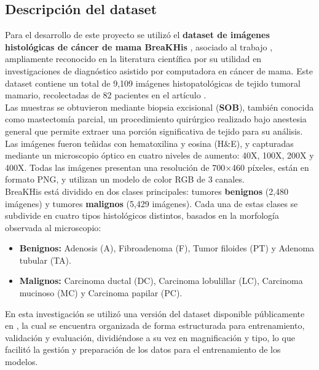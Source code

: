 \documentclass[12pt]{article} %
\begin{document}
\subsection{Descripción del dataset}
Para el desarrollo de este proyecto se utilizó el \textbf{dataset de imágenes histológicas de cáncer de mama BreaKHis} \cite{google_drive_folder}, asociado al trabajo \cite{bardou2018classification}, ampliamente reconocido en la literatura científica por su utilidad en investigaciones de diagnóstico asistido por computadora en cáncer de mama. Este dataset contiene un total de 9,109 imágenes histopatológicas de tejido tumoral mamario, recolectadas de 82 pacientes en el artículo \cite{spanhol2015dataset}.\\

Las muestras se obtuvieron mediante biopsia excisional (\textbf{SOB}), también conocida como mastectomía parcial, un procedimiento quirúrgico realizado bajo anestesia general que permite extraer una porción significativa de tejido para su análisis. Las imágenes fueron teñidas con hematoxilina y eosina (H\&E), y capturadas mediante un microscopio óptico en cuatro niveles de aumento: 40X, 100X, 200X y 400X. Todas las imágenes presentan una resolución de 700×460 píxeles, están en formato PNG, y utilizan un modelo de color RGB de 3 canales. \\

BreaKHis está dividido en dos clases principales: tumores \textbf{benignos} (2,480 imágenes) y tumores \textbf{malignos} (5,429 imágenes). Cada una de estas clases se subdivide en cuatro tipos histológicos distintos, basados en la morfología observada al microscopio: \\

\begin{itemize}
    \item \textbf{Benignos:} Adenosis (A), Fibroadenoma (F), Tumor filoides (PT) y Adenoma tubular (TA).
    \item \textbf{Malignos:} Carcinoma ductal (DC), Carcinoma lobulillar (LC), Carcinoma mucinoso (MC) y Carcinoma papilar (PC).
\end{itemize}

En esta investigación se utilizó una versión del dataset disponible públicamente en \cite{google_drive_folder}, la cual se encuentra organizada de forma estructurada para entrenamiento, validación y evaluación, dividiéndose a su vez en magnificación y tipo, lo que facilitó la gestión y preparación de los datos para el entrenamiento de los modelos. \\
\end{document}
